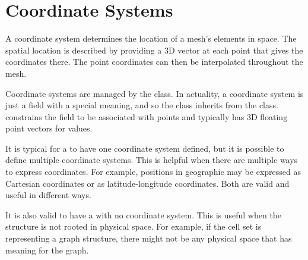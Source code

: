 
\section{Coordinate Systems}
\label{sec:DataSets:CoordinateSystems}


A coordinate system determines the location of a mesh's elements in space.
The spatial location is described by providing a 3D vector at each point
that gives the coordinates there. The point coordinates can then be
interpolated throughout the mesh.

Coordinate systems are managed by the  class. In
actuality, a coordinate system is just a field with a special meaning, and
so the  class inherits from the
 class.  constrains
the field to be associated with points and typically has 3D floating point
vectors for values.

It is typical for a  to have one coordinate system
defined, but it is possible to define multiple coordinate systems. This is
helpful when there are multiple ways to express coordinates. For example,
positions in geographic may be expressed as Cartesian coordinates or as
latitude-longitude coordinates. Both are valid and useful in different
ways.

It is also valid to have a  with no coordinate
system. This is useful when the structure is not rooted in physical space.
For example, if the cell set is representing a graph structure, there might
not be any physical space that has meaning for the graph.


